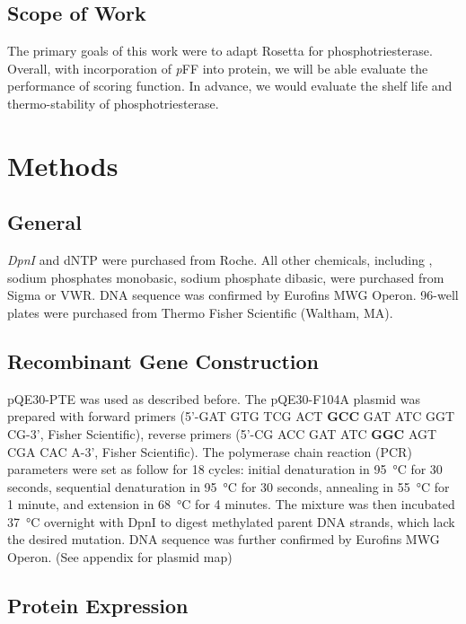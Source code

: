 \begin{refsection}
\subsection{Scope of Work}

The primary goals of this work were to adapt Rosetta for phosphotriesterase.
Overall, with incorporation of \emph{p}FF into protein, we will be able
evaluate the performance of scoring function. In advance, we would evaluate the
shelf life and thermo-stability of phosphotriesterase.

\section{Methods}

\subsection{General}

\emph{DpnI} and dNTP were purchased from Roche. All other chemicals, including
, sodium phosphates monobasic, sodium phosphate dibasic, were
purchased from Sigma or VWR. DNA sequence was confirmed by Eurofins MWG Operon.
96-well plates were purchased from Thermo Fisher Scientific (Waltham, MA).

\subsection{Recombinant Gene Construction}

pQE30-PTE was used as described before\cite{Baker2011b}. The pQE30-F104A plasmid
was prepared with forward primers (5’-GAT GTG TCG ACT \textbf{GCC} GAT ATC GGT
CG-3’, Fisher Scientific), reverse primers (5’-CG ACC GAT ATC \textbf{GGC} AGT
CGA CAC A-3’, Fisher Scientific). The polymerase chain reaction (PCR)
parameters were set as follow for 18 cycles: initial denaturation in
\SI{95}{\celsius} for 30 seconds, sequential denaturation in \SI{95}{\celsius}
for 30 seconds, annealing in \SI{55}{\celsius} for 1 minute, and extension in
\SI{68}{\celsius} for 4 minutes. The mixture was then incubated
\SI{37}{\celsius} overnight with DpnI to digest methylated parent DNA strands,
which lack the desired mutation. DNA sequence was further confirmed by Eurofins
MWG Operon. (See appendix for plasmid map)

\subsection{Protein Expression}
\label{sec:protein-expression-method}


\end{refsection}
